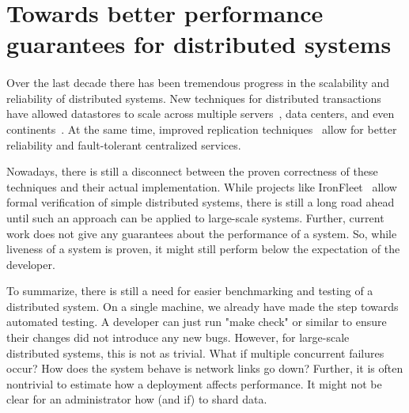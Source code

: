 \section{Towards better performance guarantees for distributed systems}

\paragraph{}
Over the last decade there has been tremendous progress in the scalability and reliability of distributed systems.
New techniques for distributed transactions have allowed datastores to scale across multiple servers~\cite{aguilera2007sinfonia}, data centers, and even continents~\cite{Lloyd:2011:DSE:2043556.2043593}.  At the same time, improved replication techniques~\cite{van2004chain} allow for better reliability and fault-tolerant centralized services.

Nowadays, there is still a disconnect between the proven correctness of these techniques and their actual implementation. While projects like IronFleet~\cite{hawblitzel2015ironfleet} allow formal verification of simple distributed systems, there is still a long road ahead until such an approach can be applied to large-scale systems.
Further, current work does not give any guarantees about the performance of a system. So, while liveness of a system is proven, it might still perform below the expectation of the developer.

To summarize, there is still a need for easier benchmarking and testing of a distributed system.
On a single machine, we already have made the step towards automated testing.
A developer can just run "make check" or similar to ensure their changes did not introduce any new bugs. However, for large-scale distributed systems, this is not as trivial. What if multiple concurrent failures occur? How does the system behave is network links go down?
Further, it is often nontrivial to estimate how a deployment affects performance. It might not be clear for an administrator how (and if) to shard data.

